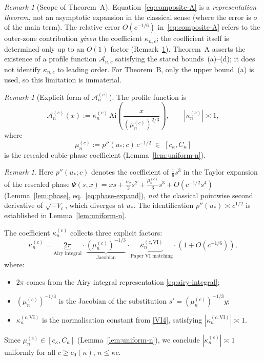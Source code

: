 \documentclass[12pt,a4paper]{amsart}
\theoremstyle{definition}
\theoremstyle{remark}
\newtheorem{remark}[theorem]{Remark}
\newtheorem*{remark*}{Remark}
\newcommand{\Ai}{\mathrm{Ai}}
\newcommand{\ustar}{u_*}
\begin{document}
\begin{remark}[Scope of Theorem~A]\label{rem:thmA-scope}
Equation~\eqref{eq:composite-A} is a \emph{representation theorem},
not an asymptotic expansion in the classical sense
(where the error is $o$ of the main term).
The relative error $O(c^{-1/6})$ in~\eqref{eq:composite-A}
refers to the outer-zone contribution \emph{given} the
coefficient $\kappa_{n,c}$; the coefficient itself is determined
only up to an $O(1)$ factor (Remark~\ref{rem:A-explicit}).
Theorem~A asserts the existence of a profile function
$\mathcal{A}_{n,c}$ satisfying the stated bounds~(a)--(d);
it does not identify $\kappa_{n,c}$ to leading order.
For Theorem~B, only the upper bound~(a) is used,
so this limitation is immaterial.
\end{remark}

\begin{remark}[Explicit form of $\mathcal{A}_n^{(c)}$]
\label{rem:A-explicit}
The profile function is
\begin{equation}
\label{eq:A-explicit}
\mathcal{A}_n^{(c)}(x)
:= \kappa_n^{(c)}\,
\Ai\!\left(\frac{x}{(\mu_n^{(c)})^{2/3}}\right),
\qquad |\kappa_n^{(c)}| \asymp 1,
\end{equation}
where
\begin{equation}
\label{eq:mu-def}
\mu_n^{(c)} := p''(\ustar;c)\,c^{-1/2}
\;\in\; [c_\kappa, C_\kappa]
\end{equation}
is the rescaled cubic-phase coefficient
(Lemma~\ref{lem:uniform-n}).
\begin{remark*}
Here $p''(\ustar;c)$ denotes the coefficient
of $\tfrac{1}{6}s^3$ in the Taylor expansion
of the rescaled phase
$\Psi(s,x) = xs + \tfrac{\alpha_2}{2}s^2
+ \tfrac{\mu_n^{(c)}}{6}s^3 + O(c^{-1/2}s^4)$
(Lemma~\ref{lem:phase}, eq.~\eqref{eq:phase-expand}),
\emph{not} the classical pointwise second
derivative of $\sqrt{-V_c}$,
which diverges at $\ustar$.
The identification $p''(\ustar) \asymp c^{1/2}$
is established in Lemma~\ref{lem:uniform-n}.
\end{remark*}
The coefficient $\kappa_n^{(c)}$ collects
three explicit factors:
\begin{equation}
\label{eq:kappa-explicit}
\kappa_n^{(c)}
= \underbrace{2\pi}_{\text{Airy integral}}
  \cdot
  \underbrace{(\mu_n^{(c)})^{-1/3}}_{\text{Jacobian}}
  \cdot
  \underbrace{\kappa_n^{(c,\mathrm{VI})}}_{\text{Paper~VI matching}}
  \cdot (1 + O(c^{-1/6})),
\end{equation}
where:
\begin{itemize}
\item $2\pi$ comes from the Airy integral
  representation \eqref{eq:airy-integral};
\item $(\mu_n^{(c)})^{-1/3}$ is the Jacobian
  of the substitution $s' = (\mu_n^{(c)})^{-1/3}y$;
\item $\kappa_n^{(c,\mathrm{VI})}$ is the
  normalisation constant from \eqref{VI4},
  satisfying $|\kappa_n^{(c,\mathrm{VI})}| \asymp 1$.
\end{itemize}
Since $\mu_n^{(c)} \in [c_\kappa, C_\kappa]$
(Lemma~\ref{lem:uniform-n}), we conclude
$|\kappa_n^{(c)}| \asymp 1$
uniformly for all $c \ge c_0(\kappa)$,
$n \le \kappa c$.


\end{remark}
\end{document}
